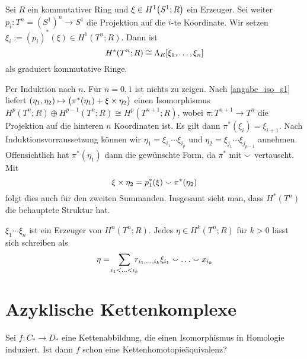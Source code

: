 \begin{satz}[{name=[Kohomologie des Torus]}]
	Sei $R$ ein kommutativer Ring und $\xi \in H^1 \enbrace*{S^1;R}$ ein Erzeuger. 
	Sei weiter $p_i \colon T^n = (S^1)^n \to S^1$ die Projektion auf die $i$-te Koordinate. 
	Wir setzen $\xi_i := (p_i)^*(\xi) \in H^1(T^n;R)$. Dann ist 
	\[
		H^*(T^n;R) \cong \Lambda_R \benbrace*{\xi_1, \ldots ,\xi_n}
	\]
	als graduiert kommutative Ringe.
\end{satz}
\begin{beweis}
	Per Induktion nach $n$. Für $n=0,1$ ist nichts zu zeigen. 
	Nach \autoref{angabe_iso_s1} liefert $(\eta_1,\eta_2) \mapsto \enbrace[\big]{\pi^*(\eta_1) + \xi\times \eta_2}$ einen Isomorphismus $H^p(T^n;R) \oplus H^{p-1}(T^n;R) \cong H^{p}(T^{n+1};R)$, wobei $\pi \colon T^{n+1} \to T^n$ die Projektion auf die hinteren $n$ Koordinaten ist.
	Es gilt dann $\pi^*(\xi_i) = \xi_{i+1}$.
	Nach Induktionsvorraussetzung können wir $\eta_1 = \xi_{i_1} \cdots \xi_{i_p}$ und $\eta_2 = \xi_{j_1} \cdots \xi_{j_{p-1}}$ annehmen.
	Offensichtlich hat $\pi^*(\eta_1)$ dann die gewünschte Form, da $\pi^*$ mit $\cupp$ vertauscht. Mit 
	\[
		\xi \times \eta_2 = p_1^*(\xi) \cupp \pi^*(\eta_2)
	\]
	folgt dies auch für den zweiten Summanden.
	Insgesamt sieht man, dass $H^*(T^n)$ die behauptete Struktur hat.
\end{beweis}

\begin{beispiel}[{name=[Kohomologieklassen des Torus]}]
	$\xi_1 \cdots \xi_n$ ist ein Erzeuger von $H^n(T^n;R)$. Jedes $\eta \in H^k(T^n;R)$ für $k>0$ lässt sich schreiben als
	\[
		\eta= \!\smashoperator[r]{\sum_{i_1<\ldots <i_k}}\,\, r_{i_1,\ldots ,i_k} \xi_{i_1} \cupp \ldots \cupp x_{i_k}
	\]
\end{beispiel}
\newpage

\section{Azyklische Kettenkomplexe} %
\label{sec:5}

\begin{frage}
	Sei $f  \colon C_* \to D_*$ eine Kettenabbildung, die einen Isomorphismus in Homologie induziert. Ist dann $f$ schon eine Kettenhomotopieäquivalenz?
\end{frage}

